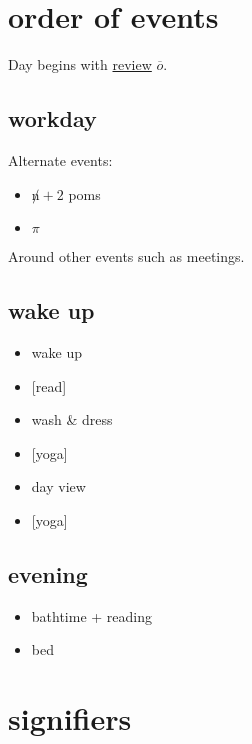 \documentclass[]{book}
\providecommand{\tightlist}{%
  \setlength{\itemsep}{0pt}\setlength{\parskip}{0pt}}
\begin{document}
\hypertarget{order-of-events}{%
\section{order of events}\label{order-of-events}}

Day begins with \protect\hyperlink{review}{review} \(\overline o\).

\hypertarget{workday}{%
\subsection{workday}\label{workday}}

Alternate events:

\begin{itemize}
\tightlist
\item
  \(\not n + 2\) poms
\item
  \(\pi\)
\end{itemize}

Around other events such as meetings.

\hypertarget{wake-up}{%
\subsection{wake up}\label{wake-up}}

\begin{itemize}
\tightlist
\item
  wake up
\item
  {[}read{]}
\item
  wash \& dress
\item
  {[}yoga{]}
\item
  \protect\hypertarget{day-view}{}{day view}
\item
  {[}yoga{]}
\end{itemize}

\hypertarget{evening}{%
\subsection{evening}\label{evening}}

\begin{itemize}
\tightlist
\item
  bathtime + reading
\item
  bed
\end{itemize}

\hypertarget{signifiers}{%
\section{signifiers}\label{signifiers}}
\end{document}
